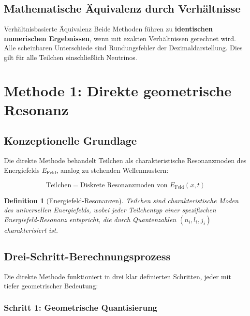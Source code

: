 \documentclass[12pt,a4paper]{article}
\newcommand{\Efield}{E_{\text{Feld}}}
\newtheorem{definition}[theorem]{Definition}
\begin{document}
	\subsection{Mathematische Äquivalenz durch Verhältnisse}
	\label{subsec:mathematical_equivalence}
	
	\begin{keyresult}{Verhältnisbasierte Äquivalenz}{}
		Beide Methoden führen zu \textbf{identischen numerischen Ergebnissen}, wenn mit exakten Verhältnissen gerechnet wird. Alle scheinbaren Unterschiede sind Rundungsfehler der Dezimaldarstellung. Dies gilt für alle Teilchen einschließlich Neutrinos.
	\end{keyresult}
	
	\section{Methode 1: Direkte geometrische Resonanz}
	\label{sec:direct_geometric_method}
	
	\subsection{Konzeptionelle Grundlage}
	\label{subsec:direct_principles}
	
	Die direkte Methode behandelt Teilchen als charakteristische Resonanzmoden des Energiefelds $\Efield$, analog zu stehenden Wellenmustern:
	
	\begin{equation}
		\text{Teilchen} = \text{Diskrete Resonanzmoden von } \Efield(x,t)
	\end{equation}
	
	\begin{definition}[Energiefeld-Resonanzen]
		Teilchen sind charakteristische Moden des universellen Energiefelds, wobei jeder Teilchentyp einer spezifischen Energiefeld-Resonanz entspricht, die durch Quantenzahlen $(n_i, l_i, j_i)$ charakterisiert ist.
	\end{definition}
	
	\subsection{Drei-Schritt-Berechnungsprozess}
	\label{subsec:three_step_process}
	
	Die direkte Methode funktioniert in drei klar definierten Schritten, jeder mit tiefer geometrischer Bedeutung:
	
	\subsubsection{Schritt 1: Geometrische Quantisierung}
	\label{subsubsec:step1}
	
\end{document}
